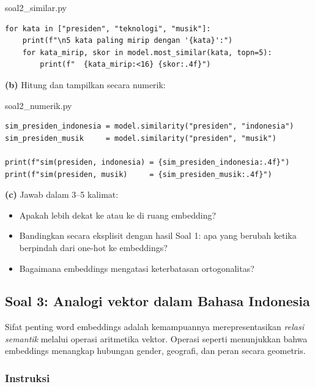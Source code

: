 \documentclass[12pt, a4paper]{article}
\begin{document}
\begin{codewindow}{soal2\_similar.py}
\begin{lstlisting}[style=pycode]
for kata in ["presiden", "teknologi", "musik"]:
    print(f"\n5 kata paling mirip dengan '{kata}':")
    for kata_mirip, skor in model.most_similar(kata, topn=5):
        print(f"  {kata_mirip:<16} {skor:.4f}")
\end{lstlisting}
\end{codewindow}

\textbf{(b)} Hitung dan tampilkan secara numerik:

\begin{codewindow}{soal2\_numerik.py}
\begin{lstlisting}[style=pycode]
sim_presiden_indonesia = model.similarity("presiden", "indonesia")
sim_presiden_musik     = model.similarity("presiden", "musik")

print(f"sim(presiden, indonesia) = {sim_presiden_indonesia:.4f}")
print(f"sim(presiden, musik)     = {sim_presiden_musik:.4f}")
\end{lstlisting}
\end{codewindow}

\textbf{(c)} Jawab dalam 3--5 kalimat:
\begin{itemize}
  \item Apakah  lebih dekat ke  atau ke  di ruang embedding?
  \item Bandingkan secara eksplisit dengan hasil Soal 1: apa yang berubah ketika berpindah dari one-hot ke embeddings?
  \item Bagaimana embeddings mengatasi keterbatasan ortogonalitas?
\end{itemize}

\subsection{Soal 3: Analogi vektor dalam Bahasa Indonesia}
\label{sec:soal3}

Sifat penting word embeddings adalah kemampuannya merepresentasikan \emph{relasi semantik} melalui operasi aritmetika vektor. Operasi seperti  menunjukkan bahwa embeddings menangkap hubungan gender, geografi, dan peran secara geometris.

\subsubsection{Instruksi}
\label{sec:soal3-instruksi}
\end{document}

